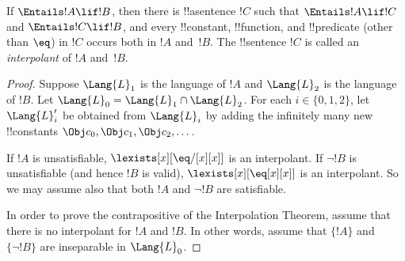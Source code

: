 \documentclass[../../../include/open-logic-section]{subfiles}
\begin{document}

\begin{thm}
If $\Entails !A \lif !B$, then there is !!a{sentence} $!C$ such that
$\Entails !A \lif !C$ and $\Entails !C \lif !B$, and every
!!{constant}, !!{function}, and !!{predicate} (other than $\eq$) in
$!C$ occurs both in $!A$ and~$!B$. The !!{sentence} $!C$ is called an
\emph{interpolant} of $!A$ and~$!B$.
\end{thm}

\begin{proof}
Suppose $\Lang{L}_1$ is the language of $!A$ and $\Lang{L}_2$ is the
language of $!B$. Let $\Lang{L}_0 = \Lang{L}_1 \cap \Lang{L}_2$. For
each $i \in \{0, 1, 2 \}$, let $\Lang{L}'_i$ be obtained from
$\Lang{L}_i$ by adding the infinitely many new !!{constant}s $\Obj c_0,
\Obj c_1, \Obj c_2, \dots$. 

If $!A$ is unsatisfiable, $\lexists[x][\eq/[x][x]]$ is an
interpolant. If $\lnot !B$ is unsatisfiable (and hence $!B$ is valid),
$\lexists[x][\eq[x][x]]$ is an interpolant. So we may assume also that
both $!A$ and $\lnot !B$ are satisfiable.

In order to prove the contrapositive of the Interpolation Theorem,
assume that there is no interpolant for $!A$ and $!B$. In other words,
assume that $\{!A\}$ and $\{\lnot !B\}$ are inseparable in
$\Lang{L}_0$.


\end{proof}
\end{document}
